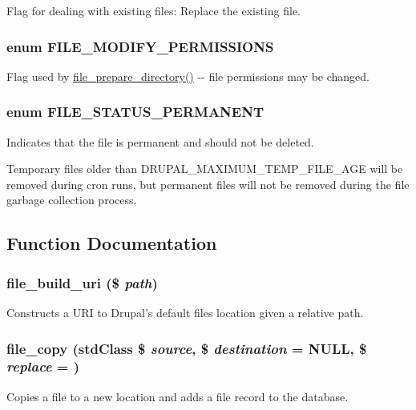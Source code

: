 \label{group__file_ga54c3c90d9cb7857114326cb5114e7159}
Flag for dealing with existing files: Replace the existing file. \hypertarget{group__file_ga30d56f1f9c1a4d832c411ef51d9b276d}{
\subsubsection[{FILE\_\-MODIFY\_\-PERMISSIONS}]{\setlength{\rightskip}{0pt plus 5cm}enum {\bf FILE\_\-MODIFY\_\-PERMISSIONS}}}
\label{group__file_ga30d56f1f9c1a4d832c411ef51d9b276d}
Flag used by \hyperlink{group__file_ga738f89421a4f4c228676de817e5e485c}{file\_\-prepare\_\-directory()} -\/-\/ file permissions may be changed. \hypertarget{group__file_gaf208a7c7d7fd09276233583b22e4ee32}{
\subsubsection[{FILE\_\-STATUS\_\-PERMANENT}]{\setlength{\rightskip}{0pt plus 5cm}enum {\bf FILE\_\-STATUS\_\-PERMANENT}}}
\label{group__file_gaf208a7c7d7fd09276233583b22e4ee32}
Indicates that the file is permanent and should not be deleted.

Temporary files older than DRUPAL\_\-MAXIMUM\_\-TEMP\_\-FILE\_\-AGE will be removed during cron runs, but permanent files will not be removed during the file garbage collection process. 

\subsection{Function Documentation}
\hypertarget{group__file_ga6855ddd89be373ff7ea584d2ec66ea9a}{
\subsubsection[{file\_\-build\_\-uri}]{\setlength{\rightskip}{0pt plus 5cm}file\_\-build\_\-uri (\$ {\em path})}}
\label{group__file_ga6855ddd89be373ff7ea584d2ec66ea9a}
Constructs a URI to Drupal's default files location given a relative path. \hypertarget{group__file_gae49a2da7203ef43ae7adcf128d58d860}{
\subsubsection[{file\_\-copy}]{\setlength{\rightskip}{0pt plus 5cm}file\_\-copy (stdClass \$ {\em source}, \/  \$ {\em destination} = {\ttfamily NULL}, \/  \$ {\em replace} = {})}}
\label{group__file_gae49a2da7203ef43ae7adcf128d58d860}
Copies a file to a new location and adds a file record to the database.

